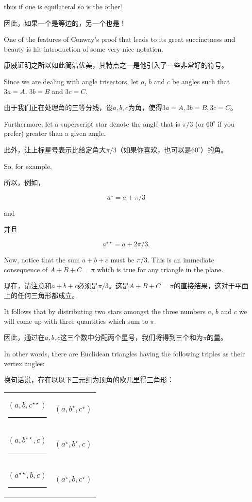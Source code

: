 thus if one is equilateral so is the other!

因此，如果一个是等边的，另一个也是！

One of the features of Conway's proof that leads to its great succinctness
and beauty is his introduction of some very nice notation.

康威证明之所以如此简洁优美，其特点之一是他引入了一些非常好的符号。

Since we are dealing with angle trisectors, let $a$, $b$ and $c$ be 
angles such that $3a=A$, $3b=B$ and $3c=C$.

由于我们正在处理角的三等分线，设$a, b, c$为角，使得$3a=A, 3b=B, 3c=C$。

Furthermore, let a superscript
star denote the angle that is $\pi/3$ (or $60^\circ$ if you prefer) greater
than a given angle.

此外，让上标星号表示比给定角大$\pi/3$（如果你喜欢，也可以是$60^\circ$）的角。

So, for example, 

所以，例如，

\[ a^\star = a + \pi/3 \]

\noindent and 

\noindent 并且

\[ a^{\star\star} = a + 2\pi/3. \]

Now, notice that the sum $a+b+c$ must be $\pi/3$.  This is an 
immediate consequence of $A+B+C=\pi$ which is true for any triangle
in the plane.

现在，请注意和$a+b+c$必须是$\pi/3$。这是$A+B+C=\pi$的直接结果，这对于平面上的任何三角形都成立。

It follows that by distributing two stars amongst 
the three numbers $a$, $b$ and $c$ we will come up with three
quantities which sum to $\pi$.

因此，通过在$a, b, c$这三个数中分配两个星号，我们将得到三个和为$\pi$的量。

In other words, there are 
Euclidean triangles having the following 
triples as their vertex angles:

换句话说，存在以以下三元组为顶角的欧几里得三角形：

\begin{center}
\begin{tabular}{cc}
\rule{0pt}{18pt} $(a, b, c^{\star\star})$ \rule{18pt}{0pt} & $(a, b^\star, c^\star)$ \\
\rule{0pt}{18pt} $(a, b^{\star\star}, c)$ \rule{18pt}{0pt} & $(a^\star, b^\star, c)$ \\
\rule{0pt}{18pt} $(a^{\star\star}, b, c)$ \rule{18pt}{0pt} & $(a^\star, b, c^\star)$ \\
\end{tabular}
\end{center}

